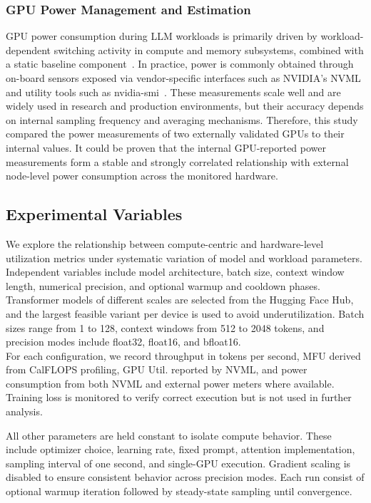 \documentclass[runningheads]{llncs}
\begin{document}
\subsubsection{GPU Power Management and Estimation}\label{energy estimation}
GPU power consumption during LLM workloads is primarily driven by workload-dependent switching activity in compute and memory subsystems, combined with a static baseline component~\cite{lang-2013}. In practice, power is commonly obtained through on-board sensors exposed via vendor-specific interfaces such as NVIDIA's NVML and utility tools such as nvidia-smi~\cite{nvidia-2016,weakley-2025}. These measurements scale well and are widely used in research and production environments, but their accuracy depends on internal sampling frequency and averaging mechanisms. Therefore, this study compared the power measurements of two externally validated GPUs to their internal values. It could be proven that the internal GPU-reported power measurements form a stable and strongly correlated relationship with external node-level power consumption across the monitored hardware. 

\subsection{Experimental Variables}\label{exp. variables}
We explore the relationship between compute-centric and hardware-level utilization metrics under systematic variation of model and workload parameters. Independent variables include model architecture, batch size, context window length, numerical precision, and optional warmup and cooldown phases. Transformer models of different scales are selected from the Hugging Face Hub, and the largest feasible variant per device is used to avoid underutilization. Batch sizes range from 1 to 128, context windows from 512 to 2048 tokens, and precision modes include float32, float16, and bfloat16.\\
For each configuration, we record throughput in tokens per second, MFU derived from CalFLOPS profiling, GPU Util. reported by NVML, and power consumption from both NVML and external power meters where available. Training loss is monitored to verify correct execution but is not used in further analysis.

All other parameters are held constant to isolate compute behavior. These include optimizer choice, learning rate, fixed prompt, attention implementation, sampling interval of one second, and single-GPU execution. Gradient scaling is disabled to ensure consistent behavior across precision modes. Each run consist of optional warmup iteration followed by steady-state sampling until convergence.
\end{document}
